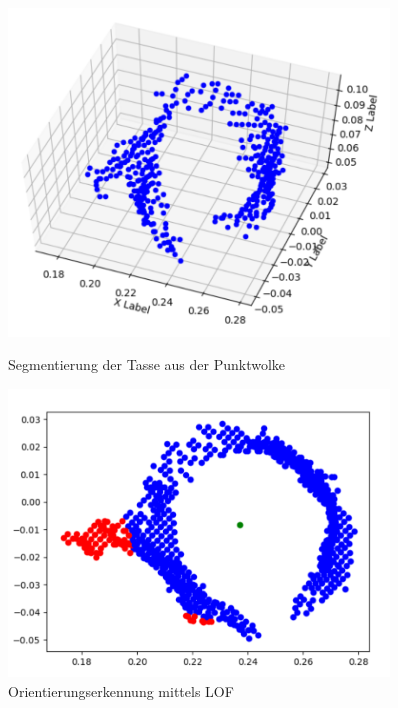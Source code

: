 \begin{figure}
    \centering
    \begin{minipage}{0.45\textwidth}
        \centering
        \includegraphics[width=0.9\textwidth]{images/cup_3d.png} %
        \caption{Segmentierung der Tasse aus der Punktwolke \label{fig:cup_segmentation}}
    \end{minipage}\hfill
    \begin{minipage}{0.45\textwidth}
        \centering
        \includegraphics[width=0.9\textwidth]{images/cup_handle.png} %
        \caption{Orientierungserkennung mittels LOF \label{fig:orientation_detection}}
    \end{minipage}
\end{figure}